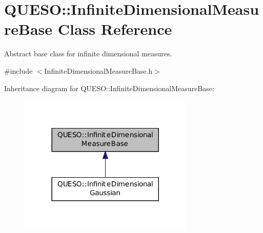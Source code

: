 \hypertarget{class_q_u_e_s_o_1_1_infinite_dimensional_measure_base}{\section{Q\-U\-E\-S\-O\-:\-:Infinite\-Dimensional\-Measure\-Base Class Reference}
\label{class_q_u_e_s_o_1_1_infinite_dimensional_measure_base}
}


Abstract base class for infinite dimensional measures.  




{\ttfamily \#include $<$Infinite\-Dimensional\-Measure\-Base.\-h$>$}



Inheritance diagram for Q\-U\-E\-S\-O\-:\-:Infinite\-Dimensional\-Measure\-Base\-:
\nopagebreak
\begin{figure}[H]
\begin{center}
\leavevmode
\includegraphics[width=236pt]{class_q_u_e_s_o_1_1_infinite_dimensional_measure_base__inherit__graph}
\end{center}
\end{figure}
